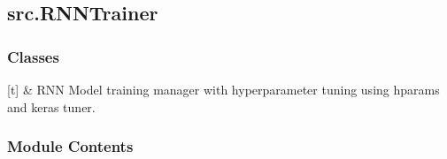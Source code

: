 \documentclass[letterpaper,10pt,english]{sphinxmanual}
\begin{document}
\sphinxstepscope


\subsection{src.RNNTrainer}
\label{\detokenize{autoapi/src/RNNTrainer/index:module-src.RNNTrainer}}\label{\detokenize{autoapi/src/RNNTrainer/index:src-rnntrainer}}\label{\detokenize{autoapi/src/RNNTrainer/index::doc}}

\subsubsection{Classes}
\label{\detokenize{autoapi/src/RNNTrainer/index:classes}}

\begin{savenotes}\sphinxattablestart
\sphinxthistablewithglobalstyle
\sphinxthistablewithnovlinesstyle
\centering
\begin{tabulary}{\linewidth}[t]{}
\sphinxtoprule
\sphinxtableatstartofbodyhook
\sphinxAtStartPar
{\hyperref[\detokenize{autoapi/src/RNNTrainer/index:src.RNNTrainer.RNNTrainer}]{}}
&
\sphinxAtStartPar
RNN Model training manager with hyperparameter tuning using hparams and keras tuner.
\\
\sphinxbottomrule
\end{tabulary}
\sphinxtableafterendhook\par
\sphinxattableend\end{savenotes}


\subsubsection{Module Contents}
\label{\detokenize{autoapi/src/RNNTrainer/index:module-contents}}

\begin{fulllineitems}
\label{\detokenize{autoapi/src/RNNTrainer/index:src.RNNTrainer.RNNTrainer}}
\pysigstartsignatures
\pysiglinewithargsret
{}
{\sphinxparamcomma {}}
{}
\pysigstopsignatures
\end{fulllineitems}
\end{document}
